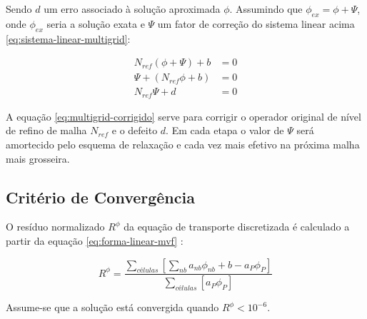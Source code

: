 Sendo $d$ um erro associado à solução aproximada $\phi$. Assumindo que $\phi_{ex} = \phi + \Psi$, onde $\phi_{ex}$ seria a solução exata e $\Psi$ um fator de correção do sistema linear acima \ref{eq:sistema-linear-multigrid}:

\begin{subequations}\label{eq:multigrid-corrigido} 
\begin{align}
    N_{ref}(\phi + \Psi) + b &= 0 \\
    \Psi + (N_{ref}\phi + b) &= 0 \\
    N_{ref}\Psi + d &= 0
\end{align}
\end{subequations}

A equação \ref{eq:multigrid-corrigido} serve para corrigir o operador original de nível de refino de malha $N_{ref}$ e o defeito $d$. Em cada etapa o valor de $\Psi$ será amortecido pelo esquema de relaxação e cada vez mais efetivo na próxima malha mais grosseira.

\subsection{Critério de Convergência}

O resíduo normalizado $R^{\phi}$ da equação de transporte discretizada é calculado a partir da equação \ref{eq:forma-linear-mvf} \cite{Rezende2009}:

\begin{equation}
\label{eq:criterio-convergencia}
	R^{\phi} = \frac{\sum_{células} \left[\sum_{nb}a_{nb}\phi_{nb}+b-a_{P}\phi_{P}\right] }{\sum_{células}\left[a_{P}\phi_{P}\right]}    
\end{equation}

Assume-se que a solução está convergida quando $R^{\phi} < 10^{-6}$.
